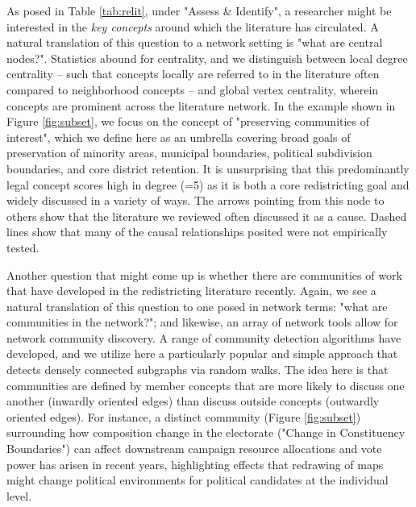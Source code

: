 \documentclass{cup-pan}
\begin{document}
As posed in Table \ref{tab:relit}, under "Assess \& Identify", a researcher might be interested in the \textit{key concepts} around which the literature has circulated. A natural translation of this question to a network setting is "what are central nodes?". Statistics abound for centrality, and we distinguish between local degree centrality -- such that concepts locally are referred to in the literature often compared to neighborhood concepts -- and global vertex centrality, wherein concepts are prominent across the literature network. In the example shown in Figure \ref{fig:subset}, we focus on the concept of "preserving communities of interest", which we define here as an umbrella covering broad goals of preservation of minority areas, municipal boundaries, political subdivision boundaries, and core district retention. It is unsurprising that this predominantly legal concept scores high in degree (=5) as it is both a core redistricting goal and widely discussed in a variety of ways. The arrows pointing from this node to others show that the literature we reviewed often discussed it as a cause. Dashed lines show that many of the causal relationships posited were not empirically tested. \par 

Another question that might come up is whether there are communities of work that have developed in the redistricting literature recently. Again, we see a natural translation of this question to one posed in network terms: "what are communities in the network?"; and likewise, an array of network tools allow for network community discovery. A range of community detection algorithms have developed, and we utilize here a particularly popular and simple approach that detects densely connected subgraphs via random walks. The idea here is that communities are defined by member concepts that are more likely to discuss one another (inwardly oriented edges) than discuss outside concepts (outwardly oriented edges). For instance, a distinct community (Figure \ref{fig:subset}) surrounding how composition change in the electorate ("Change in Constituency Boundaries") can affect downstream campaign resource allocations and vote power has arisen in recent years, highlighting effects that redrawing of maps might change political environments for political candidates at the individual level.\par 
\end{document}
